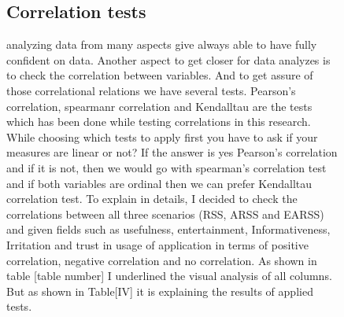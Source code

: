\documentclass[letterpaper, 10 pt, conference]{ieeeconf}
\begin{document}
\begin{figure}[h!]
\subsection{Correlation tests}
analyzing data from many aspects give always able to have fully confident on data. Another aspect to get closer for data analyzes is to check the correlation between variables. And to get assure of those correlational relations we have several tests. Pearson’s correlation, spearmanr correlation and Kendalltau are the tests which has been done while testing correlations in this research. While choosing which tests to apply first you have to ask if your measures are linear or not? If the answer is yes Pearson’s correlation and if it is not, then we would go with spearman’s correlation test and if both variables are ordinal then we can prefer Kendalltau correlation test. To explain in details, I decided to check the correlations between all three scenarios (RSS, ARSS and EARSS) and given fields such as usefulness, entertainment, Informativeness, Irritation and trust in usage of application in terms of positive correlation, negative correlation and no correlation. As shown in table [table number] I underlined the visual analysis of all columns. But as shown in Table[IV] it is explaining the results of applied tests.
\end{figure}
\end{document}
